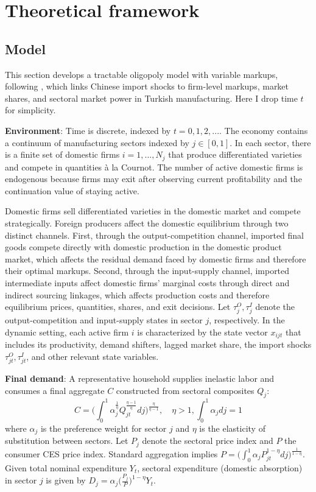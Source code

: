 \documentclass[12pt]{article}
\begin{document}
\section{Theoretical framework}

\subsection{Model}
This section develops a tractable oligopoly model with variable markups, following \textcite{atkesonPricingtoMarketTradeCosts2008}, which links Chinese import shocks to firm-level markups, market shares, and sectoral market power in Turkish manufacturing. Here I drop time $t$ for simplicity. 

\textbf{Environment}: Time is discrete, indexed by $t=0,1,2,...$. The economy contains a continuum of manufacturing sectors indexed by $j \in [0,1]$. In each sector, there is a finite set of domestic firms $i = 1, ..., N_j$ that produce differentiated varieties and compete in quantities à la Cournot. The number of active domestic firms is endogenous because firms may exit after observing current profitability and the continuation value of staying active. 

Domestic firms sell differentiated varieties in the domestic market and compete strategically. Foreign producers affect the domestic equilibrium through two distinct channels. First, through the output-competition channel, imported final goods compete directly with domestic production in the domestic product market, which affects the residual demand faced by domestic firms and therefore their optimal markups. Second, through the input-supply channel, imported intermediate inputs affect domestic firms' marginal costs through direct and indirect sourcing linkages, which affects production costs and therefore equilibrium prices, quantities, shares, and exit decisions. Let $\tau^O_j, \tau^I_j$ denote the output-competition and input-supply states in sector $j$, respectively. In the dynamic setting, each active firm $i$ is characterized by the state vector $x_{ijt}$ that includes its productivity, demand shifters, lagged market share, the import shocks $\tau^O_{jt}, \tau^I_{jt}$, and other relevant state variables.

\textbf{Final demand}: A representative household supplies inelastic labor and consumes a final aggregate $C$ constructed from sectoral composites $Q_j$: 
\[C = \Bigg(\int_{0}^{1} \alpha_j^{\frac{1}{\eta}} Q_{jt}^{\frac{\eta-1}{\eta}}dj \Bigg)^{\frac{\eta}{\eta-1}}, \quad \eta > 1, \int_{0}^{1} \alpha_j dj = 1\]
where $\alpha_j$ is the preference weight for sector $j$ and $\eta$ is the elasticity of substitution between sectors. Let $P_{j}$ denote the sectoral price index and $P$ the consumer CES price index. Standard aggregation implies $P = \bigg(\int_{0}^{1} \alpha_j P_{jt}^{1-\eta} dj \bigg)^{\frac{1}{1-\eta}}$. Given total nominal expenditure $Y_t$, sectoral expenditure (domestic absorption) in sector $j$ is given by $D_{j} = \alpha_j \bigg(\frac{P_j}{P}\bigg)^{1-\eta} Y_t$. 
\end{document}
